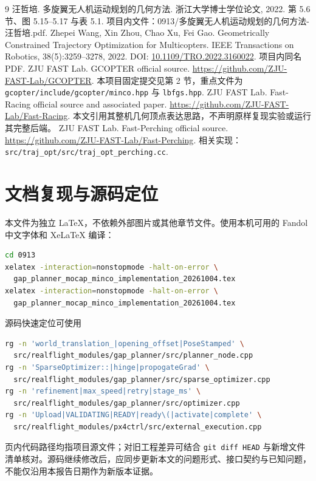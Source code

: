 \documentclass[UTF8,fontset=fandol,a4paper,10pt]{ctexart}
\newcommand{\code}[1]{{\small\nolinkurl{#1}}}
\begin{document}
\begin{thebibliography}{9}
 汪哲培. 多旋翼无人机运动规划的几何方法. 浙江大学博士学位论文, 2022. 第 5.6 节、图 5.15--5.17 与表 5.1. 项目内文件：0913/多旋翼无人机运动规划的几何方法-汪哲培.pdf.
 Zhepei Wang, Xin Zhou, Chao Xu, Fei Gao. Geometrically Constrained Trajectory Optimization for Multicopters. IEEE Transactions on Robotics, 38(5):3259--3278, 2022. DOI: \href{https://doi.org/10.1109/TRO.2022.3160022}{10.1109/TRO.2022.3160022}. 项目内同名 PDF.
 ZJU FAST Lab. GCOPTER official source. \url{https://github.com/ZJU-FAST-Lab/GCOPTER}. 本项目固定提交见第 2 节，重点文件为 \code{gcopter/include/gcopter/minco.hpp} 与 \code{lbfgs.hpp}.
 ZJU FAST Lab. Fast-Racing official source and associated paper. \url{https://github.com/ZJU-FAST-Lab/Fast-Racing}. 本文引用其整机几何顶点表达思路，不声明原样复现实验或运行其完整后端。
 ZJU FAST Lab. Fast-Perching official source. \url{https://github.com/ZJU-FAST-Lab/Fast-Perching}. 相关实现：\code{src/traj_opt/src/traj_opt_perching.cc}.
\end{thebibliography}

\appendix
\section{文档复现与源码定位}
本文件为独立 LaTeX，不依赖外部图片或其他章节文件。使用本机可用的 Fandol 中文字体和 XeLaTeX 编译：
\begin{lstlisting}[language=bash]
cd 0913
xelatex -interaction=nonstopmode -halt-on-error \
  gap_planner_mocap_minco_implementation_20261004.tex
xelatex -interaction=nonstopmode -halt-on-error \
  gap_planner_mocap_minco_implementation_20261004.tex
\end{lstlisting}
源码快速定位可使用
\begin{lstlisting}[language=bash]
rg -n 'world_translation_|opening_offset|PoseStamped' \
  src/realflight_modules/gap_planner/src/planner_node.cpp
rg -n 'SparseOptimizer::|hinge|propogateGrad' \
  src/realflight_modules/gap_planner/src/sparse_optimizer.cpp
rg -n 'refinement|max_speed|retry|stage_ms' \
  src/realflight_modules/gap_planner/src/optimizer.cpp
rg -n 'Upload|VALIDATING|READY|ready\(|activate|complete' \
  src/realflight_modules/px4ctrl/src/external_execution.cpp
\end{lstlisting}
页内代码路径均指项目源文件；对旧工程差异可结合 \code{git diff HEAD} 与新增文件清单核对。源码继续修改后，应同步更新本文的问题形式、接口契约与已知问题，不能仅沿用本报告日期作为新版本证据。
\end{document}
